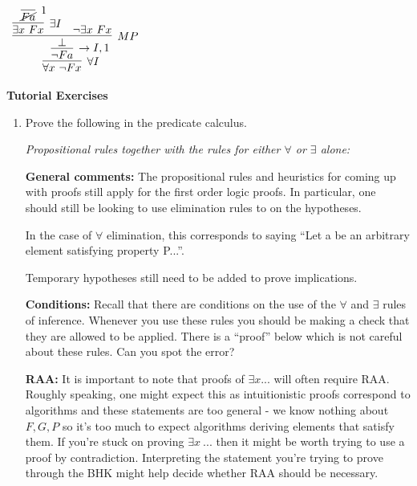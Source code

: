 \documentclass[11pt]{report}
\begin{document}
\begin{enumerate}
					\begin{mdframed}
						\begin{center}
							$\begin{array}{c}
								\infer[\forall I]{\forall x \ \lnot Fx}
									{\infer[\to I,1]{\lnot Fa}
										{\infer[MP]{\bot}
											{\infer[\exists I]{\exists x \ Fx}
												{\infer[1]{\cancel{Fa}}{}}
											&
											\lnot \exists x \ Fx}}}
							\end{array}$
						\end{center}
					\end{mdframed}
	


\end{enumerate}
\newpage
{\bf Tutorial Exercises}
\begin{enumerate}
	
	\item Prove the following in the predicate calculus. 
	
		\emph{Propositional rules together with the rules for either $\forall$ or $\exists$ alone:}

		{\bf General comments:} The propositional rules and heuristics for coming up with proofs still apply for the first order logic proofs. In particular, one should still be looking to use elimination rules to on the hypotheses. 

		In the case of $\forall$ elimination, this corresponds to saying ``Let a be an arbitrary element satisfying property P...''. 

		Temporary hypotheses still need to be added to prove implications. 

		{\bf Conditions:} Recall that there are conditions on the use of the $\forall$ and $\exists$ rules of inference. Whenever you use these rules you should be making a check that they are allowed to be applied. There is a ``proof'' below which is not careful about these rules. Can you spot the error? 

		{\bf RAA:} It is important to note that proofs of $\exists x ... $ will often require RAA. Roughly speaking, one might expect this as intuitionistic proofs correspond to algorithms and these statements are too general - we know nothing about $F,G,P$ so it's too much to expect algorithms deriving elements that satisfy them. If you're stuck on proving $\exists x \ ...$ then it might be worth trying to use a proof by contradiction. Interpreting the statement you're trying to prove through the BHK might help decide whether RAA should be necessary. 


\end{enumerate}
\end{document}
